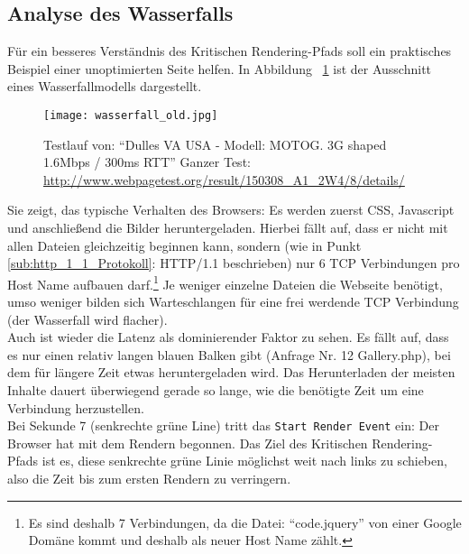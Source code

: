 
	\pagebreak

	\subsection{Analyse des Wasserfalls}
	\label{sub:analyse_des_wasserfalls}
		Für ein besseres Verständnis des Kritischen Rendering-Pfads soll ein praktisches Beispiel einer unoptimierten Seite helfen. In Abbildung ~\ref{fig:wasserfall_old} ist der Ausschnitt eines Wasserfallmodells dargestellt. 

		\begin{figure}[htbp]
			\begin{center}
				\texttt{[image: wasserfall\_old.jpg]}
				\caption{Testlauf von: "`Dulles VA USA - Modell: MOTOG. 3G shaped 1.6Mbps / 300ms RTT"' Ganzer Test: \url{http://www.webpagetest.org/result/150308_A1_2W4/8/details/}}
				\label{fig:wasserfall_old}
			\end{center}
		\end{figure}
		
	  Sie zeigt, das typische Verhalten des Browsers: Es werden zuerst CSS, Javascript und anschließend die Bilder heruntergeladen. Hierbei fällt auf, dass er nicht mit allen Dateien gleichzeitig beginnen kann, sondern (wie in Punkt \ref{sub:http_1_1_Protokoll}: HTTP/1.1 beschrieben) nur 6 TCP Verbindungen pro Host Name aufbauen darf.\footnote{Es sind deshalb 7 Verbindungen, da die Datei: "`code.jquery"' von einer Google Domäne kommt und deshalb als neuer Host Name zählt.} Je weniger einzelne Dateien die Webseite benötigt, umso weniger bilden sich Warteschlangen für eine frei werdende TCP Verbindung (der Wasserfall wird flacher).\\
	  Auch ist wieder die Latenz als dominierender Faktor zu sehen. Es fällt auf, dass es nur einen relativ langen blauen Balken gibt (Anfrage Nr. 12 Gallery.php), bei dem für längere Zeit etwas heruntergeladen wird. Das Herunterladen der meisten Inhalte dauert überwiegend gerade so lange, wie die benötigte Zeit um eine Verbindung herzustellen.\\
	  Bei Sekunde 7 (senkrechte grüne Line) tritt das \texttt{Start Render Event} ein: Der Browser hat mit dem Rendern begonnen. Das Ziel des Kritischen Rendering-Pfads ist es, diese senkrechte grüne Linie möglichst weit nach links zu schieben, also die Zeit bis zum ersten Rendern zu verringern.\\

